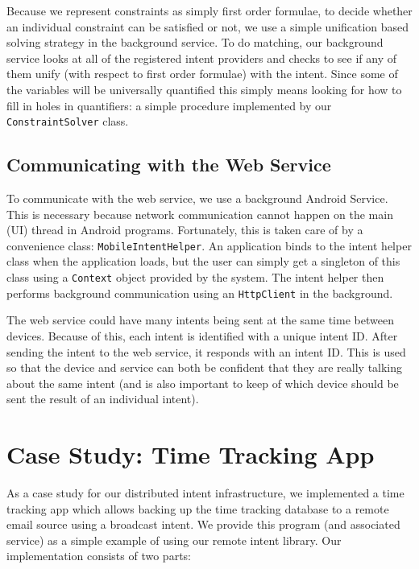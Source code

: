 \documentclass{acm_proc_article-sp}
\begin{document}
Because we represent constraints as simply first order formulae, to
decide whether an individual constraint can be satisfied or not, we
use a simple unification based solving strategy in the background
service.  To do matching, our background service looks at all of the
registered intent providers and checks to see if any of them unify
(with respect to first order formulae) with the intent.  Since some of
the variables will be universally quantified this simply means looking
for how to fill in holes in quantifiers: a simple procedure
implemented by our \texttt{ConstraintSolver} class.

\subsection{Communicating with the Web Service} 

To communicate with the web service, we use a background Android
Service.  This is necessary because network communication cannot
happen on the main (UI) thread in Android programs.  Fortunately, this
is taken care of by a convenience class: \texttt{MobileIntentHelper}.
An application binds to the intent helper class when the application
loads, but the user can simply get a singleton of this class using a
\texttt{Context} object provided by the system.  The intent helper
then performs background communication using an \texttt{HttpClient} in
the background.

The web service could have many intents being sent at the same time
between devices.  Because of this, each intent is identified with a
unique intent ID.  After sending the intent to the web service, it
responds with an intent ID.  This is used so that the device and
service can both be confident that they are really talking about the
same intent (and is also important to keep of which device should be
sent the result of an individual intent).

\section{Case Study: Time Tracking App}
\label{section:case-study}

As a case study for our distributed intent infrastructure, we
implemented a time tracking app which allows backing up the time
tracking database to a remote email source using a broadcast intent.
We provide this program (and associated service) as a simple example
of using our remote intent library.  Our implementation consists of
two parts:
\end{document}
